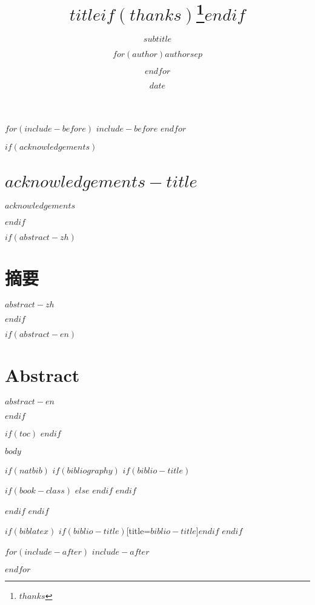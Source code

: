 \documentclass[]{book}
\title{$title$$if(thanks)$\thanks{$thanks$}$endif$}
\subtitle{$subtitle$}
\author{$for(author)$$author$$sep$ \and $endfor$}
\institute{$for(institute)$$institute$$sep$ \and $endfor$}
\date{$date$}
\begin{document}
$for(include-before)$
$include-before$
$endfor$



\clearpage
{}

{}



$if(acknowledgements)$
\chapter*{$acknowledgements-title$}
$acknowledgements$
$endif$


$if(abstract-zh)$
\chapter*{摘要}
$abstract-zh$
$endif$

$if(abstract-en)$
\chapter*{Abstract}
$abstract-en$
$endif$


$if(toc)$
{
\setcounter{tocdepth}{$toc-depth$}
\tableofcontents
}
$endif$

\newpage

\listoftables
{}
{}
\newpage

\listoffigures
{}
{}
\newpage

\let\oldShaded=\Shaded
\let\endoldShaded=\endShaded
\renewenvironment{Shaded}{
  $if(linestretch-code)$
    \begin{spacing}{$linestretch-code$}\begin{oldShaded}
  $else$
    \begin{spacing}{1.2}\begin{oldShaded}
  $endif$
  }
  {
  \end{oldShaded}
  \end{spacing}
  }

\clearpage
{}

$body$




$if(natbib)$
  $if(bibliography)$
    $if(biblio-title)$

      $if(book-class)$
        \renewcommand\bibname{$biblio-title$}
      $else$
        \renewcommand\refname{$biblio-title$}
      $endif$
    $endif$
      
  $endif$
$endif$


$if(biblatex)$
  \printbibliography$if(biblio-title)$[title={$biblio-title$}]$endif$
$endif$

$for(include-after)$
$include-after$

$endfor$
\end{document}
